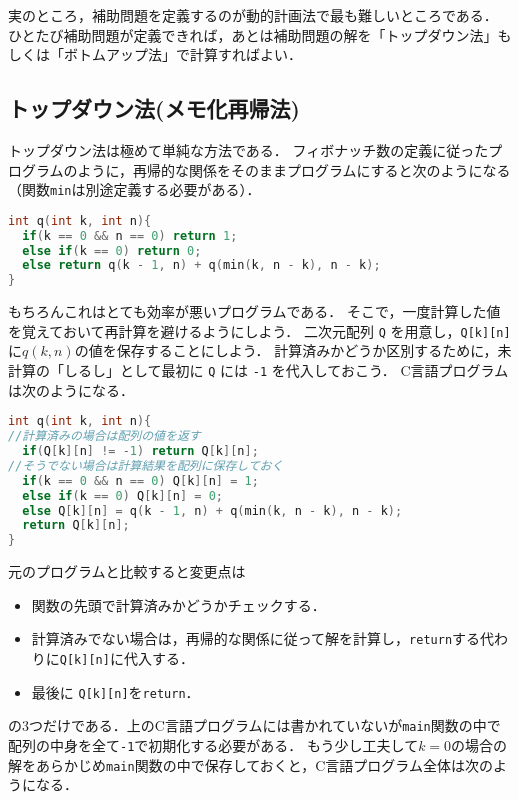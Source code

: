 \documentclass[a4paper,twoside,onecolumn,openany,article]{memoir}
\theoremstyle{remark}
\begin{document}
実のところ，補助問題を定義するのが動的計画法で最も難しいところである．
ひとたび補助問題が定義できれば，あとは補助問題の解を「トップダウン法」もしくは「ボトムアップ法」で計算すればよい．

\subsection{トップダウン法(メモ化再帰法)}
トップダウン法は極めて単純な方法である．
フィボナッチ数の定義に従ったプログラムのように，再帰的な関係をそのままプログラムにすると次のようになる（関数\texttt{min}は別途定義する必要がある）．

\begin{lstlisting}[basicstyle=\ttfamily\small,showstringspaces=false,language=C,frame=single]
int q(int k, int n){
  if(k == 0 && n == 0) return 1;
  else if(k == 0) return 0;
  else return q(k - 1, n) + q(min(k, n - k), n - k);
}
\end{lstlisting}
もちろんこれはとても効率が悪いプログラムである．
そこで，一度計算した値を覚えておいて再計算を避けるようにしよう．
二次元配列 \texttt{Q} を用意し，\texttt{Q[k][n]} に$q(k, n)$の値を保存することにしよう．
計算済みかどうか区別するために，未計算の「しるし」として最初に \texttt{Q} には \texttt{-1} を代入しておこう．
C言語プログラムは次のようになる．
\begin{lstlisting}[basicstyle=\ttfamily\small,showstringspaces=false,language=C,frame=single]
int q(int k, int n){
//計算済みの場合は配列の値を返す
  if(Q[k][n] != -1) return Q[k][n];
//そうでない場合は計算結果を配列に保存しておく
  if(k == 0 && n == 0) Q[k][n] = 1;
  else if(k == 0) Q[k][n] = 0;
  else Q[k][n] = q(k - 1, n) + q(min(k, n - k), n - k);
  return Q[k][n];
}
\end{lstlisting}
元のプログラムと比較すると変更点は
\begin{itemize}
\item 関数の先頭で計算済みかどうかチェックする．
\item 計算済みでない場合は，再帰的な関係に従って解を計算し，\texttt{return}する代わりに\texttt{Q[k][n]}に代入する．
\item 最後に \texttt{Q[k][n]}を\texttt{return}．
\end{itemize}
の3つだけである．上のC言語プログラムには書かれていないが\texttt{main}関数の中で配列の中身を全て\texttt{-1}で初期化する必要がある．
もう少し工夫して$k=0$の場合の解をあらかじめ\texttt{main}関数の中で保存しておくと，C言語プログラム全体は次のようになる．
\end{document}

